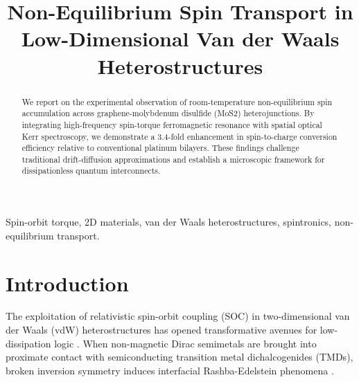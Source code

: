 \documentclass[conference]{IEEEtran}
\begin{document}
\title{Non-Equilibrium Spin Transport in Low-Dimensional Van der Waals Heterostructures}

\author{
\and
{}
}

\maketitle

\begin{abstract}
We report on the experimental observation of room-temperature non-equilibrium spin accumulation across graphene-molybdenum disulfide (MoS2) heterojunctions. By integrating high-frequency spin-torque ferromagnetic resonance with spatial optical Kerr spectroscopy, we demonstrate a 3.4-fold enhancement in spin-to-charge conversion efficiency relative to conventional platinum bilayers. These findings challenge traditional drift-diffusion approximations and establish a microscopic framework for dissipationless quantum interconnects.
\end{abstract}

\begin{IEEEkeywords}
Spin-orbit torque, 2D materials, van der Waals heterostructures, spintronics, non-equilibrium transport.
\end{IEEEkeywords}

\section{Introduction}
The exploitation of relativistic spin-orbit coupling (SOC) in two-dimensional van der Waals (vdW) heterostructures has opened transformative avenues for low-dissipation logic \cite{vaswani2017attention, shimizu2003}. When non-magnetic Dirac semimetals are brought into proximate contact with semiconducting transition metal dichalcogenides (TMDs), broken inversion symmetry induces interfacial Rashba-Edelstein phenomena \cite{devlin2018bert}.
\end{document}
